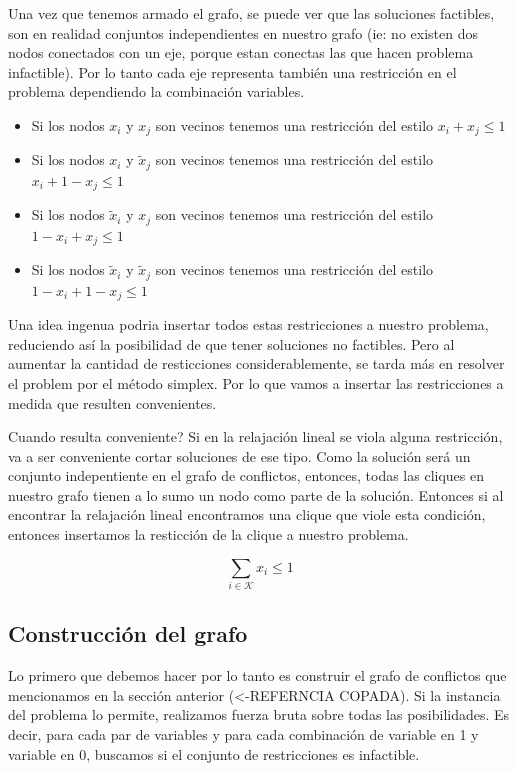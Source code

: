 Una vez que tenemos armado el grafo, se puede ver que las soluciones factibles, son en realidad conjuntos independientes en nuestro grafo
(ie: no existen dos nodos conectados con un eje, porque estan conectas las que hacen problema infactible). Por lo tanto cada eje representa
tambi\'en una restricci\'on en el problema dependiendo la combinaci\'on variables.

\begin{itemize}
\item Si los nodos $x_i$ y $x_j$ son vecinos tenemos una restricci\'on del estilo $x_i +x_j \leq 1$
\item Si los nodos $x_i$ y $\tilde{x}_j$ son vecinos tenemos una restricci\'on del estilo $x_i + 1-x_j \leq 1$
\item Si los nodos $\tilde{x}_i$ y $x_j$ son vecinos tenemos una restricci\'on del estilo $1-x_i +x_j \leq 1$
\item Si los nodos $\tilde{x}_i$ y $\tilde{x}_j$ son vecinos tenemos una restricci\'on del estilo $1-x_i + 1-x_j \leq 1$
\end{itemize}

Una idea ingenua podria insertar todos estas restricciones a nuestro problema, reduciendo as\'i la posibilidad de que tener soluciones no factibles.
Pero al aumentar la cantidad de resticciones considerablemente, se tarda m\'as en resolver el problem por el m\'etodo simplex. Por lo que vamos
a insertar las restricciones a medida que resulten convenientes.

Cuando resulta conveniente? Si en la relajaci\'on lineal se viola alguna restricci\'on, va a ser conveniente cortar soluciones de ese tipo.
Como la soluci\'on ser\'a un conjunto indepentiente en el grafo de conflictos, entonces, todas las cliques en nuestro grafo tienen a lo sumo
un nodo como parte de la soluci\'on. Entonces si al encontrar la relajaci\'on lineal encontramos una clique que viole esta condici\'on, entonces
insertamos la resticci\'on de la clique a nuestro problema.

\begin{equation}
\sum\limits_{i \in \mathcal{K}} x_i \leq 1
\end{equation}

\bigskip
\subsection{Construcci\'on del grafo}

Lo primero que debemos hacer por lo tanto es construir el grafo de conflictos que mencionamos en la secci\'on anterior (<-REFERNCIA COPADA).
Si la instancia del problema lo permite, realizamos fuerza bruta sobre todas las posibilidades. Es decir, para cada par de variables y para cada 
combinaci\'on de variable en 1 y variable en 0, buscamos si el conjunto de restricciones es infactible.

